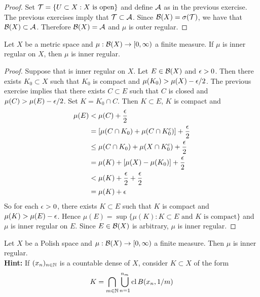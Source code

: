 \documentclass{book}
\begin{document}
	\begin{proof}
		Set $\mathcal{T} = \{U \subset X: X \text{ is open}\}$ and define $\mathcal{A}$ as in the previous exercise. The previous exercises imply that $\mathcal{T} \subset \mathcal{A}$. Since $\mathcal{B}(X) = \sigma(\mathcal{T})$, we have that $\mathcal{B}(X) \subset \mathcal{A}$. Therefore $\mathcal{B}(X) = \mathcal{A}$ and $\mu$ is outer regular.  
	\end{proof}

	\begin{ex}
		Let $X$ be a metric space and $\mu: \mathcal{B}(X) \rightarrow [0, \infty)$ a finite measure. If $\mu$ is inner regular on $X$, then $\mu$ is inner regular.
	\end{ex}

	\begin{proof}
		Suppose that is inner regular on $X$. Let $E \in \mathcal{B}(X)$ and $\epsilon >0$. Then there exists $K_0 \subset X$ such that $K_0$ is compact and $\mu(K_0) > \mu(X) - \epsilon/2$. The previous exercise implies that there exists $C \subset E$ such that $C$ is closed and $\mu(C) > \mu(E) - \epsilon/2$. Set $K = K_0 \cap C$. Then $K \subset E$, $K$ is compact and 
		\begin{align*}
			\mu(E)
			& < \mu(C) + \frac{\epsilon}{2} \\
			& =[ \mu(C \cap K_0) + \mu(C \cap K_0^c)] + \frac{\epsilon}{2} \\
			& \leq \mu(C \cap K_0) + \mu(X \cap K_0^c) + \frac{\epsilon}{2} \\
			&= \mu(K) + [\mu(X) - \mu(K_0)] + \frac{\epsilon}{2} \\
			&< \mu(K) + \frac{\epsilon}{2} + \frac{\epsilon}{2} \\
			&= \mu(K) + \epsilon
		\end{align*}
		So for each $\epsilon >0$, there exists $K \subset E$ such that $K$ is compact and $\mu(K) > \mu(E) - \epsilon$. Hence $\mu(E) = \sup\{\mu(K): K \subset E \text{ and  $K$ is compact}\}$ and $\mu$ is inner regular on $E$. Since $E \in \mathcal{B}(X)$ is arbitrary, $\mu$ is inner regular.
	\end{proof}

	\begin{ex}
		Let $X$ be a Polish space and $\mu: \mathcal{B}(X) \rightarrow [0, \infty)$ a finite measure. Then $\mu$ is inner regular. \\
		\textbf{Hint:} If $(x_{n})_{n \in \mathbb{N}}$ is a countable dense of $X$, consider $K \subset X$ of the form 
		$$K = \bigcap\limits_{m \in \mathbb{N}} \bigcup\limits_{n = 1}^{n_m} \operatorname{cl} B(x_n, 1/m) $$
	\end{ex}
\end{document}
